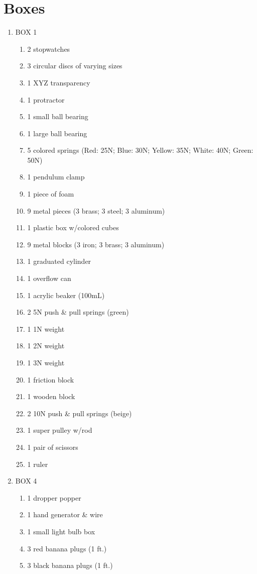 \documentclass[10pt]{article}
\begin{document}
\section{Boxes}
\begin{enumerate}
\item BOX 1
\begin{enumerate}
\item 2 stopwatches
\item 3 circular discs of varying sizes
\item 1 XYZ transparency 
\item 1 protractor
\item 1 small ball bearing
\item 1 large ball bearing
\item 5 colored springs (Red: 25N; Blue: 30N; Yellow: 35N; White: 40N; Green: 50N)
\item 1 pendulum clamp
\item 1 piece of foam
\item 9 metal pieces (3 brass; 3 steel; 3 aluminum)
\item 1 plastic box w/colored cubes
\item 9 metal blocks (3 iron; 3 brass; 3 aluminum)
\item 1 graduated cylinder
\item 1 overflow can
\item 1 acrylic beaker (100mL)
\item 2 5N push \& pull springs (green)
\item 1 1N weight
\item 1 2N weight
\item 1 3N weight
\item 1 friction block
\item 1 wooden block
\item 2 10N push \& pull springs (beige)
\item 1 super pulley w/rod
\item 1 pair of scissors
\item 1 ruler
\end{enumerate}
\item BOX 4
\begin{enumerate}
\item 1 dropper popper
\item 1 hand generator \& wire
\item 1 small light bulb box
\item 3 red banana plugs (1 ft.)
\item 3 black banana plugs (1 ft.)

\end{enumerate}
\end{enumerate}
\end{document}
